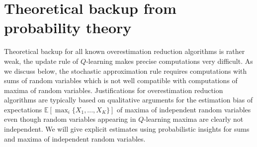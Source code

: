 \documentclass{article}
\newcommand{\E}{\mathbb{E}}
\theoremstyle{plain}
\theoremstyle{definition}
\theoremstyle{remark}
\begin{document}


 




\newpage
\appendix
\onecolumn
\section{Theoretical backup from probability theory}\label{appendix:theory}
Theoretical backup for all known overestimation reduction algorithms is rather weak, the update rule of $Q$-learning makes precise computations very difficult. As we discuss below, the stochastic approximation rule requires computations with sums of random variables which is not well compatible with computations of maxima of random variables. Justifications for overestimation reduction algorithms are typically based on qualitative arguments for the estimation bias of expectations $\E[\max_i\{ X_1,...,X_K\}]$ of maxima of independent random variables even though random variables appearing in $Q$-learning maxima are clearly not independent. We will give explicit estimates using probabilistic insights for sums and maxima of independent random variables.
\end{document}
